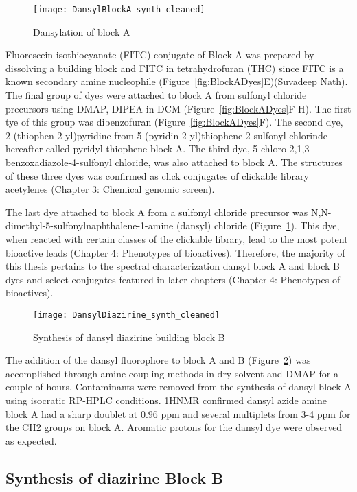 \begin{figure}
\texttt{[image: DansylBlockA\_synth\_cleaned]}
\caption{Dansylation of block A}
\label{fig:DansylBlockA}
\end{figure}

Fluorescein isothiocyanate (FITC) conjugate of Block A was prepared by dissolving a building block and FITC in tetrahydrofuran (THC) since FITC is a known secondary amine nucleophile (Figure~\ref{fig:BlockADyes}E)(Suvadeep Nath). The final group of dyes were attached to block A from sulfonyl chloride precursors using DMAP, DIPEA in DCM (Figure~\ref{fig:BlockADyes}F-H). The first tye of this group was dibenzofuran (Figure~\ref{fig:BlockADyes}F). The second dye, 2-(thiophen-2-yl)pyridine from 5-(pyridin-2-yl)thiophene-2-sulfonyl chlorinde hereafter called pyridyl thiophene block A. The third dye, 5-chloro-2,1,3-benzoxadiazole-4-sulfonyl chloride, was also attached to block A. The structures of these three dyes was confirmed as click conjugates of clickable library acetylenes (Chapter 3: Chemical genomic screen).

The last dye attached to block A from a sulfonyl chloride precursor was N,N-dimethyl-5-sulfonylnaphthalene-1-amine (dansyl) chloride (Figure~\ref{fig:DansylBlockA}). This dye, when reacted with certain classes of the clickable library, lead to the most potent bioactive leads (Chapter 4: Phenotypes of bioactives). Therefore, the majority of this thesis pertains to the spectral characterization dansyl block A and block B dyes and select conjugates featured in later chapters (Chapter 4: Phenotypes of bioactives).

\begin{figure}
\texttt{[image: DansylDiazirine\_synth\_cleaned]}
\caption{Synthesis of dansyl diazirine building block B}
\label{fig:DansylDiazirine}
\end{figure}

The addition of the dansyl fluorophore to block A and B (Figure~\ref{fig:DansylDiazirine}) was accomplished through amine coupling methods in dry solvent and DMAP for a couple of hours. Contaminants were removed from the synthesis of dansyl block A using isocratic RP-HPLC conditions. 1HNMR confirmed dansyl azide amine block A had a sharp doublet at 0.96 ppm and several multiplets from 3-4 ppm  for the CH2 groups on block A. Aromatic protons for the dansyl dye were observed as expected.

\subsection{Synthesis of diazirine Block B}

